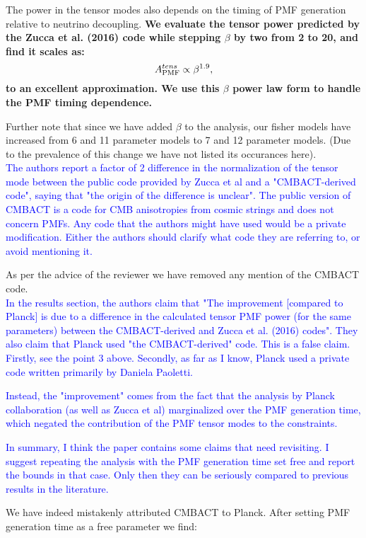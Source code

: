 \documentclass{article}
\newcommand{\apmf}{\ensuremath{A_{\rm PMF}}}
\newcommand{\be}{\begin{equation}}
\newcommand{\ee}{\end{equation}}
\newcommand{\added}[1]{\textbf{#1}}
\newcommand{\reviewer}[1]{\textcolor{Blue}{#1}}
\newcommand{\diff}[1]{\textcolor{PineGreen}{#1}}
\begin{document}
{\diff{The power in the tensor modes also depends on the timing of PMF generation relative to neutrino decoupling. 
\added{We evaluate the tensor power predicted by the Zucca et al. (2016) code while stepping $\beta$ by two from 2 to 20, and find it scales as:
\be \label{eqn:betascaling}
\apmf^{tens} \propto \beta^{1.9},
\ee
to an excellent approximation. 
We use this $\beta$ power law form to handle the PMF timing dependence.}}


Further note that since we have added $\beta$ to the analysis, our fisher models have increased from 6 and 11 parameter models to 7 and 12 parameter models. (Due to the prevalence of this change we have not listed its occurances here).\\


\reviewer{The authors report a factor of 2 difference in the normalization of the tensor mode between the public code provided by Zucca et al and a "CMBACT-derived code", saying that "the origin of the difference is unclear". The public version of CMBACT is a code for CMB anisotropies from cosmic strings and does not concern PMFs. Any code that the authors might have used would be a private modification. Either the authors should clarify what code they are referring to, or avoid mentioning it.}

As per the advice of the reviewer we have removed any mention of the CMBACT code.\\


\reviewer{In the results section, the authors claim that "The improvement [compared to Planck] is due to a difference in the calculated tensor PMF power (for the same parameters) between the CMBACT-derived and Zucca et al. (2016) codes". They also claim that Planck used "the CMBACT-derived" code. This is a false claim. Firstly, see the point 3 above. Secondly, as far as I know, Planck used a private code written primarily by Daniela Paoletti.}

\reviewer{Instead, the "improvement" comes from the fact that the analysis by Planck collaboration (as well as Zucca et al) marginalized over the PMF generation time, which negated the contribution of the PMF tensor modes to the constraints.}

\reviewer{In summary, I think the paper contains some claims that need revisiting. I suggest repeating the analysis with the PMF generation time set free and report the bounds in that case. Only then they can be seriously compared to previous results in the literature.}

We have indeed mistakenly attributed CMBACT to Planck. After setting PMF generation time as a free parameter we find:

}
\end{document}

